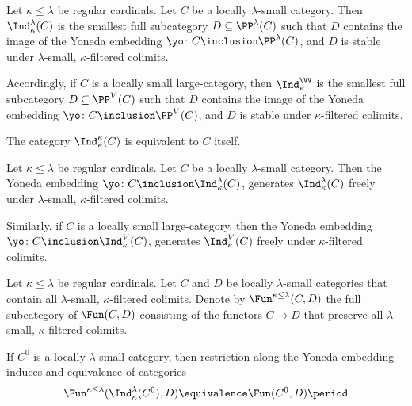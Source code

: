 \begin{definition}
	Let $ \kappa \leq \lambda $ be regular cardinals.
	Let $ C $ be a locally $ \lambda $-small category.
	Then $ \Ind_{\kappa}^{\lambda}(C) $ is
	the smallest full subcategory $ D \subseteq \PP^{\lambda}(C) $
	such that $ D $ contains the image
	of the Yoneda embedding
	$ \yo \colon C \inclusion \PP^{\lambda}(C) $,
	and $ D $ is stable under
	$ \lambda $-small, $ \kappa $-filtered colimits.

	Accordingly, if $ C $ is a locally small large-category,
	then $ \Ind_{\kappa}^{\VV} $ is
	the smallest full subcategory $ D \subseteq \PP^V(C) $
	such that $ D $ contains the image
	of the Yoneda embedding
	$ \yo \colon C \inclusion \PP^V(C) $,
	and $ D $ is stable under $ \kappa $-filtered colimits.
\end{definition}

\begin{eg}
	The category $ \Ind_{\kappa}^{\kappa}(C) $ is
	equivalent to $ C $ itself.
\end{eg}

\begin{proposition}
	Let $ \kappa \leq \lambda $ be regular cardinals.
	Let $ C $ be a locally $ \lambda $-small category.
	Then the Yoneda embedding
	$ \yo \colon C \inclusion \Ind_{\kappa}^{\lambda}(C) $,
	generates $ \Ind_{\kappa}^{\lambda}(C) $ freely under
	$ \lambda $-small, $ \kappa $-filtered colimits.

	Similarly, if $ C $ is a locally small large-category,
	then the Yoneda embedding
	$ \yo \colon C \inclusion \Ind_{\kappa}^{V}(C) $,
	generates $ \Ind_{\kappa}^V(C) $ freely under
	$ \kappa $-filtered colimits.
\end{proposition}

\begin{notation}
	Let $ \kappa \leq \lambda $ be regular cardinals.
	Let $ C $ and $ D $  be locally $ \lambda $-small categories
	that contain all $ \lambda $-small, $ \kappa $-filtered colimits.
	Denote by $ \Fun^{\kappa \leq \lambda}(C, D) $
	the full subcategory of $ \Fun(C,D) $ consisting of
	the functors $ C \to D $ that preserve all 
	$ \lambda $-small, $ \kappa $-filtered colimits.

	If $ C^0 $ is a locally $ \lambda $-small category,
	then restriction along the Yoneda embedding
	induces and equivalence of categories
	\[
		\Fun^{\kappa \leq \lambda}(\Ind_{\kappa}^{\lambda}(C^0), D)
		\equivalence \Fun(C^0, D) \period
	\]
\end{notation}

